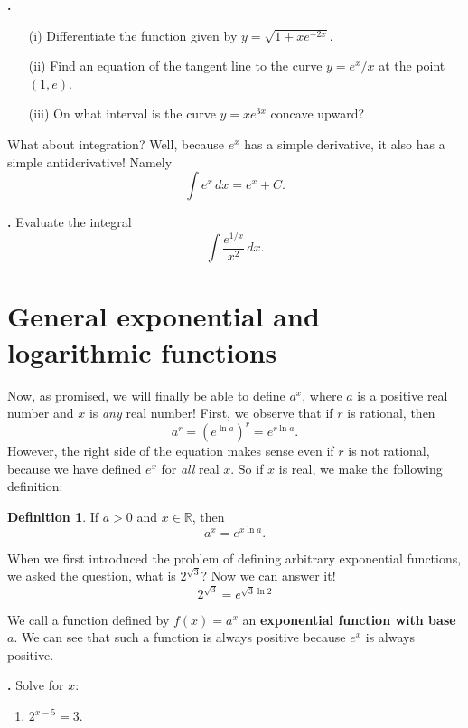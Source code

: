 \documentclass[t]{beamer}
\theoremstyle{plain}
\theoremstyle{definition}
\newtheorem{dfn}{Definition}
\newcounter{heading}
\newcommand{\newhead}[1]{\medskip\stepcounter{heading}\noindent\textbf{\hspace{0.2cm}{#1}.}}
\begin{document}
\begin{frame}
\newhead{Examples}
\begin{enumerate}[<+->]
\item[(i)] Differentiate the function given by $y = \sqrt{1 + xe^{-2x}}$.
\vspace*{.5cm}
\item[(ii)] Find an equation of the tangent line to the curve $y = e^{x}/x$ at the point $(1, e)$.
\vspace*{.5cm}
\item[(iii)] On what interval is the curve $y = xe^{3x}$ concave upward?
\end{enumerate}


\end{frame}

\begin{frame}
\noindent What about integration?  Well, because $e^{x}$ has a simple derivative, it also has a simple antiderivative!  Namely
\[ \int e^{x} \, dx = e^{x} + C.\]\pause

\newhead{Example}  Evaluate the integral \[ \int \frac{e^{1/x}}{x^{2}}\,dx. \]
\end{frame}

\section{General exponential and logarithmic functions}
\begin{frame}
\noindent Now, as promised, we will finally be able to define $a^{x}$, where $a$ is a positive real number and $x$ is \emph{any} real number!  First, we observe that if $r$ is rational, then
\[ a^{r} = (e^{\ln a})^{r} = e^{r \ln a}.\]\pause
However, the right side of the equation makes sense even if $r$ is not rational, because we have defined $e^{x}$ for \emph{all} real $x$.  So if $x$ is real, we make the following definition:\pause

\begin{dfn} If $a>0$ and $x \in \mathbb{R}$, then
\[ a^{x} = e^{x \ln a}.\]\end{dfn}\pause
When we first introduced the problem of defining arbitrary exponential functions, we asked the question, what is $2^{\sqrt{3}}$?  Now we can answer it!
\[ 2^{\sqrt{3}} = e^{\sqrt{3}\ln 2} \]\pause


\end{frame}

\begin{frame}

\noindent We call a function defined by $f(x) = a^{x}$ an \textbf{exponential function with base $a$}.  We can see that such a function is always positive because $e^{x}$ is always positive.\pause

\vspace*{.5cm}

\newhead{Example}
Solve for $x$:\begin{enumerate}
\item $2^{x-5} = 3$.
\end{enumerate}
\end{frame}
\end{document}
